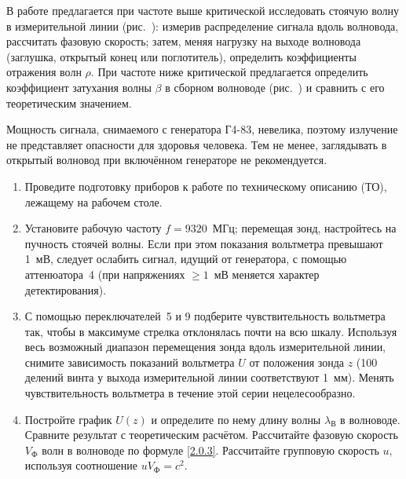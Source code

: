 \begin{lab:task}

В работе предлагается при частоте выше критической исследовать стоячую волну в измерительной линии (рис.~): измерив распределение сигнала вдоль волновода, рассчитать фазовую скорость; затем, меняя нагрузку на выходе волновода (заглушка, открытый конец или поглотитель), определить коэффициенты отражения волн $\rho.$ При частоте ниже критической предлагается определить коэффициент затухания волны $\beta$ в сборном волноводе (рис.~) и сравнить с его теоретическим значением.


Мощность сигнала, снимаемого с генератора Г4-83, невелика, поэтому излучение не представляет опасности для здоровья человека. Тем не менее, заглядывать в открытый волновод при включённом генераторе не рекомендуется.

\begin{enumerate}

	\item Проведите подготовку приборов к работе по техническому описанию (ТО), лежащему на рабочем столе.
	
	\item Установите рабочую частоту $f=9320$~МГц; перемещая зонд, настройтесь на пучность стоячей волны. Если при этом показания вольтметра превышают 1~мВ, следует ослабить сигнал, идущий от генератора, с помощью аттенюатора~4 (при напряжениях $\ge1$~мВ меняется характер детектирования).
	
	\item С помощью переключателей~5 и 9 подберите чувствительность вольтметра так, чтобы в максимуме стрелка отклонялась почти на всю шкалу. Используя весь возможный диапазон перемещения зонда вдоль измерительной линии, снимите зависимость показаний вольтметра $U$ от положения зонда $z$ (100 делений винта у выхода измерительной линии соответствуют 1~мм). Менять чувствительность вольтметра в течение этой серии нецелесообразно.
	
	\item Постройте график $U(z)$ и определите по нему длину волны $\lambda_{\text{В}}$ в волноводе. Сравните результат с теоретическим расчётом. Рассчитайте фазовую скорость $V_{\text{Ф}}$ волн в волноводе по формуле \eqref{2.0.3}. Рассчитайте групповую скорость $u,$ используя соотношение $uV_{\text{Ф}}=c^2.$	


\end{enumerate}
\end{lab:task}
